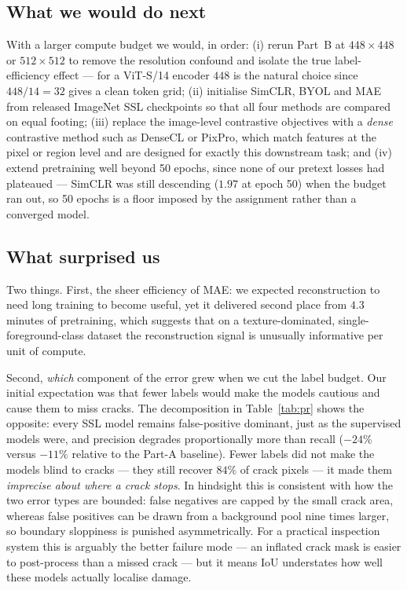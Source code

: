 \documentclass[conference]{IEEEtran}
\begin{document}
\subsection{What we would do next}
With a larger compute budget we would, in order: (i) rerun Part~B at
$448\times448$ or $512\times512$ to remove the resolution confound and isolate the
true label-efficiency effect --- for a ViT-S/14 encoder $448$ is the natural choice
since $448/14 = 32$ gives a clean token grid; (ii) initialise SimCLR, BYOL and MAE
from released ImageNet SSL checkpoints so that all four methods are compared on equal
footing; (iii) replace the image-level contrastive objectives with a
\emph{dense} contrastive method such as DenseCL or PixPro, which match features at
the pixel or region level and are designed for exactly this downstream task; and
(iv) extend pretraining well beyond 50 epochs, since none of our pretext losses had
plateaued --- SimCLR was still descending ($1.97$ at epoch 50) when the budget ran
out, so 50 epochs is a floor imposed by the assignment rather than a converged model.

\subsection{What surprised us}
Two things. First, the sheer efficiency of MAE: we expected reconstruction to need
long training to become useful, yet it delivered second place from $4.3$ minutes of
pretraining, which suggests that on a texture-dominated, single-foreground-class
dataset the reconstruction signal is unusually informative per unit of compute.

Second, \emph{which} component of the error grew when we cut the label budget. Our
initial expectation was that fewer labels would make the models cautious and cause
them to miss cracks. The decomposition in Table~\ref{tab:pr} shows the opposite:
every SSL model remains false-positive dominant, just as the supervised models were,
and precision degrades proportionally more than recall ($-24\%$ versus $-11\%$
relative to the Part-A baseline). Fewer labels did not make the models blind to
cracks --- they still recover $84\%$ of crack pixels --- it made them \emph{imprecise
about where a crack stops}. In hindsight this is consistent with how the two error
types are bounded: false negatives are capped by the small crack area, whereas false
positives can be drawn from a background pool nine times larger, so boundary
sloppiness is punished asymmetrically. For a practical inspection system this is
arguably the better failure mode --- an inflated crack mask is easier to post-process
than a missed crack --- but it means IoU understates how well these models actually
localise damage.
\end{document}
